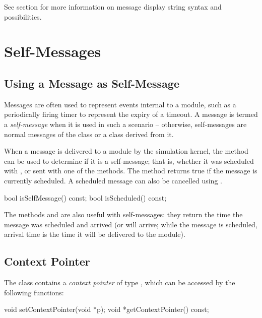 See section \label{sec:graphics:message-displaystrings} for
more information on message display string syntax and possibilities.



\section{Self-Messages}
\label{sec:msgs:self-messages}

\subsection{Using a Message as Self-Message}
\label{sec:messages:using-message-as-self-message}

Messages are often used to represent events internal to a module,
such as a periodically firing timer to represent the expiry of a timeout.
A message is termed a \textit{self-message} when it is used
in such a scenario -- otherwise, self-messages are normal messages
of the  class or a class derived from it.

When a message is delivered to a module by the simulation kernel, the
 method can be used to determine if it is
a self-message; that is, whether it was scheduled with ,
or sent with one of the  methods. The 
method returns true if the message is currently scheduled. A scheduled
message can also be cancelled using .

\begin{cpp}
bool isSelfMessage() const;
bool isScheduled() const;
\end{cpp}

The methods  and  are also
useful with self-messages: they return the time the message was scheduled
and arrived (or will arrive; while the message is scheduled, arrival time
is the time it will be delivered to the module).


\subsection{Context Pointer}
\label{sec:messages:context-pointer}

The  class contains a \textit{context pointer} of type ,
which can be accessed by the following functions:

\begin{cpp}
void setContextPointer(void *p);
void *getContextPointer() const;
\end{cpp}

